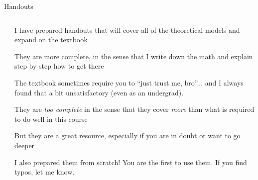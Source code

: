 \documentclass[notes,11pt, aspectratio=169, xcolor=table]{beamer}
\newenvironment{wideitemize}{\itemize\addtolength{\itemsep}{10pt}}{\enditemize}
\begin{document}
\begin{frame}{Handouts}

\begin{columns}[T] %
\begin{column}{.4\textwidth}
\end{column}%
\hfill%
\begin{column}{.58\textwidth}
  \begin{wideitemize}
  { \scriptsize
  \item I have prepared handouts that will cover all of the theoretical models and expand on the textbook
  \item<2-> They are more complete, in the sense that I write down the math and explain step by step how to get there
  \item<3-> The textbook sometimes require you to ``just trust me, bro''... and I always found that a bit unsatisfactory (even as an undergrad).
  \item<4-> They are \textit{too complete} in the sense that they cover \textit{more} than what is required to do well in this course
  \item<5-> But they are a great resource, especially if you are in doubt or  want to go deeper
  \item<6-> I also prepared them from scratch! You are the first to use them. If you find typos, let me know.
  }
  \end{wideitemize}
\end{column}%
\end{columns}
\end{frame}
\end{document}
